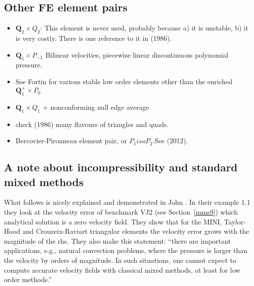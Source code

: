 \subsection{Other FE element pairs}

\begin{itemize}

\item ${\bm Q}_2\times Q_2$: This element is never used, probably because 
a) it is unstable, b) it is very costly. 
There is one reference to it in \textcite{hufb86} (1986).

\item ${\bm Q}_1\times P_{-1}$ Bilinear velocities,  piecewise linear discontinuous polynomial pressure.

\item See Fortin \cite{fort81} for various stable low order elements other than the enriched 
${\bm Q}_1^+ \times P_0$

\item ${\bm Q}_1\times Q_1$ + nonconforming null edge average \cite{fros07}

\item check \textcite{dhhu86} (1986) many flavours of triangles and quads.

\item Bercovier-Pironneau element pair, or $P_1isoP_2$.See \textcite{bocg12} (2012).

\end{itemize}

\subsection{A note about incompressibility and standard mixed methods}

What follows is nicely explained and demonstrated in John \etal \cite{jolm17}. In their 
example 1.1 they look at the velocity error of benchmark VJ2 (see Section~\ref{mms9}) 
which analytical solution is a zero velocity field. They show that for the MINI, 
Taylor-Hood and Crouzeix-Raviart triangular elements the velocity error grows 
with the magnitude of the rhs. They also make this statement:
``there are important applications, e.g., natural
convection problems, where the pressure is larger than the velocity by orders
of magnitude. In such situations, one cannot expect to compute accurate
velocity fields with classical mixed methods, at least for low order methods.''


